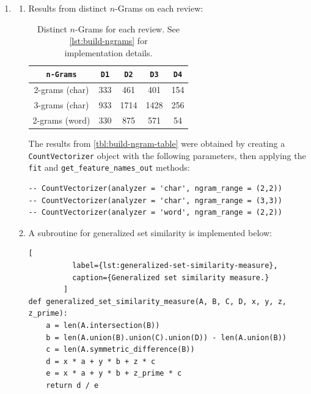 \documentclass{article}
\begin{document}
\begin{enumerate}[leftmargin={*}, font={\bf}, label={\arabic*.}, ref={\arabic*}]
  \item \label{qst:1}
    \begin{enumerate}[label={(\Alph*)}, ref={\theenumi(\Alph*)}]
      \item \label{qst:1A}
        Results from distinct $n$-Grams on each review:
        \begin{table}[H]
          \centering
          \begin{tabular}{|ccccc|}
            \hline
            {\tt n-Grams} & {\tt D1} & {\tt D2} & {\tt D3} & {\tt D4} \\ \hline \hline
            2-grams (char) & 333 & 461 & 401 & 154 \\ \hline
            3-grams (char) & 933 & 1714 & 1428 & 256 \\ \hline
            2-grams (word) & 330 & 875 & 571 & 54 \\ \hline
          \end{tabular}
          \caption{
            Distinct $n$-Grams for each review. See \autoref{lst:build-ngrams} for \\
            implementation details.
          }
          \label{tbl:build-ngram-table}
        \end{table}
        The results from \autoref{tbl:build-ngram-table} were obtained by creating a
        {\tt CountVectorizer} object with the following parameters, then applying the
        {\tt fit} and {\tt get\_feature\_names\_out} methods:

        \begin{lstlisting}
-- CountVectorizer(analyzer = 'char', ngram_range = (2,2))
-- CountVectorizer(analyzer = 'char', ngram_range = (3,3))
-- CountVectorizer(analyzer = 'word', ngram_range = (2,2))
        \end{lstlisting}

      \item \label{qst:1B}
        A subroutine for generalized set similarity is implemented below:
        \begin{lstlisting}[
          label={lst:generalized-set-similarity-measure},
          caption={Generalized set similarity measure.}
        ]
def generalized_set_similarity_measure(A, B, C, D, x, y, z, z_prime):
    a = len(A.intersection(B))
    b = len(A.union(B).union(C).union(D)) - len(A.union(B))
    c = len(A.symmetric_difference(B))
    d = x * a + y * b + z * c
    e = x * a + y * b + z_prime * c
    return d / e
        \end{lstlisting}


\end{enumerate}
\end{enumerate}
\end{document}
